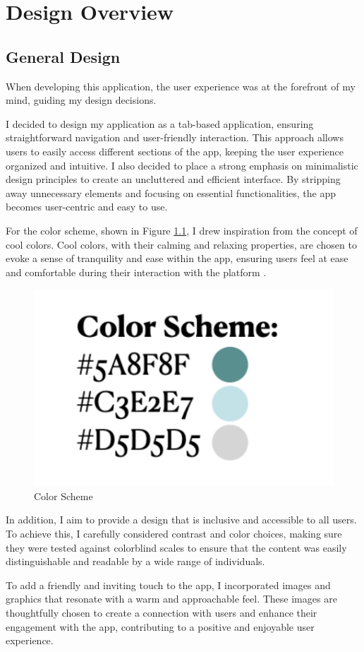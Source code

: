 \chapter{Design Overview}

\section{General Design}

When developing this application, the user experience was at the forefront of my mind, guiding my design decisions.

I decided to design my application as a tab-based application, ensuring straightforward navigation and user-friendly interaction. This approach allows users to easily access different sections of the app, keeping the user experience organized and intuitive. I also decided to place a strong emphasis on minimalistic design principles to create an uncluttered and efficient interface. By stripping away unnecessary elements and focusing on essential functionalities, the app becomes user-centric and easy to use.

For the color scheme, shown in Figure \ref{fig:color-scheme}, I drew inspiration from the concept of cool colors. Cool colors, with their calming and relaxing properties, are chosen to evoke a sense of tranquility and ease within the app, ensuring users feel at ease and comfortable during their interaction with the platform \cite{Bilucaglia}.

\begin{figure}[H]
    \centering
    \includegraphics[width=0.2\linewidth]{thesis//chapters//images/colorScheme.png}
    \caption{Color Scheme}
    \label{fig:color-scheme}
\end{figure}

In addition, I aim to provide a design that is inclusive and accessible to all users. To achieve this, I carefully considered contrast and color choices, making sure they were tested against colorblind scales to ensure that the content was easily distinguishable and readable by a wide range of individuals.

To add a friendly and inviting touch to the app, I incorporated images and graphics that resonate with a warm and approachable feel. These images are thoughtfully chosen to create a connection with users and enhance their engagement with the app, contributing to a positive and enjoyable user experience.

